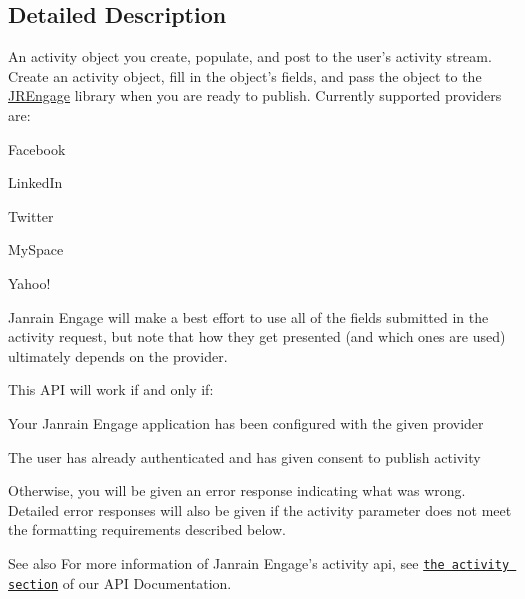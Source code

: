 \subsection{Detailed Description}
An activity object you create, populate, and post to the user's activity stream. Create an activity object, fill in the object's fields, and pass the object to the \hyperlink{interface_j_r_engage}{JREngage} library when you are ready to publish. Currently supported providers are:
\begin{DoxyItemize}
\item Facebook
\item LinkedIn
\item Twitter
\item MySpace
\item Yahoo!
\end{DoxyItemize}

Janrain Engage will make a best effort to use all of the fields submitted in the activity request, but note that how they get presented (and which ones are used) ultimately depends on the provider.

This API will work if and only if:
\begin{DoxyItemize}
\item Your Janrain Engage application has been configured with the given provider
\item The user has already authenticated and has given consent to publish activity
\end{DoxyItemize}

Otherwise, you will be given an error response indicating what was wrong. Detailed error responses will also be given if the activity parameter does not meet the formatting requirements described below.

\begin{DoxySeeAlso}{See also}
For more information of Janrain Engage's activity api, see \href{https://rpxnow.com/docs#api_activity}{\tt the activity section} of our API Documentation. 
\end{DoxySeeAlso}


